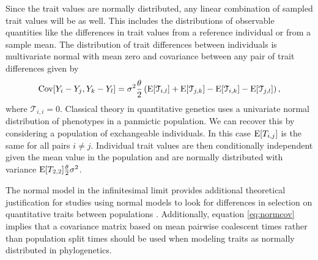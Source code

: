 Since the trait values are normally distributed, any linear combination of
sampled trait values will be as well. This includes the distributions of
observable quantities like the differences in trait values from a reference
individual or from a sample mean. The distribution of trait differences between
individuals is multivariate normal with mean zero and covariance between any
pair of trait differences given by
\begin{equation}
  \label{eq:normcov}
\mathrm{Cov}[Y_i-Y_j,Y_k-Y_l] = \sigma^2\frac{\theta}{2}\left( \mathrm{E}[\mathcal{T}_{i,l}] + \mathrm{E}[\mathcal{T}_{j,k}] -
\mathrm{E}[\mathcal{T}_{i,k}] - \mathrm{E}[\mathcal{T}_{j,l}] \right),
\end{equation}
where $\mathcal{T}_{i,i} = 0$. Classical theory in quantitative genetics uses a
univariate normal distribution of phenotypes in a panmictic population. We can
recover this by considering a population of exchangeable individuals. In this
case $\mathrm{E}[T_{i,j}]$ is the same for all pairs $i \neq j$. Individual trait values
are then conditionally independent given the mean value in the population and
are normally distributed with variance $\mathrm{E}[T_{2,2}]\frac{\theta}{2}\sigma^2$.

The normal model in the infinitesimal limit provides additional theoretical
justification for studies using normal models to look for differences in
selection on quantitative traits between populations
\citep{Ovaskainen2011,Praebel2013,Robinson2015}. Additionally, equation
\eqref{eq:normcov} implies that a covariance matrix based on mean pairwise
coalescent times rather than population split times should be used when modeling
traits as normally distributed in phylogenetics.

 
